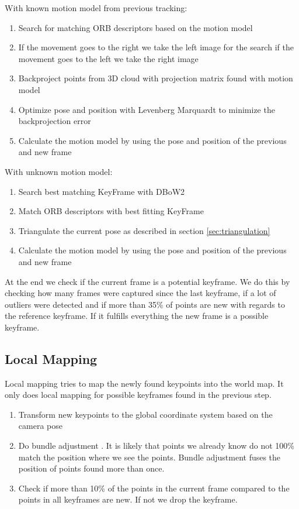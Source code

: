 \documentclass[11pt,a4paper,titlepage,oneside]{report}
\begin{document}
With known motion model from previous tracking:
\begin{enumerate}
	\item Search for matching ORB descriptors based on the motion model
	\item If the movement goes to the right we take the left image for the search if the movement goes to the left we take the right image
	\item Backproject points from 3D cloud with projection matrix found with motion model
	\item Optimize pose and position with Levenberg Marquardt \cite{levenbergmarquardt} to minimize the backprojection error
	\item Calculate the motion model by using the pose and position of the previous and new frame
\end{enumerate}

With unknown motion model:
\begin{enumerate}
	\item Search best matching KeyFrame with DBoW2 \cite{dbow}
	\item Match ORB descriptors with best fitting KeyFrame
	\item Triangulate the current pose as described in section \ref{sec:triangulation}
	\item Calculate the motion model by using the pose and position of the previous and new frame
\end{enumerate}

At the end we check if the current frame is a potential keyframe. We do this by checking how many frames were captured since the last keyframe, if a lot of outliers were detected and if more than 35\% of points are new with regards to the reference keyframe. If it fulfills everything the new frame is a possible keyframe.\\

\subsection{Local Mapping}
Local mapping tries to map the newly found keypoints into the world map. It only does local mapping for possible keyframes found in the previous step.
\begin{enumerate}
	\item Transform new keypoints to the global coordinate system based on the camera pose
	\item Do bundle adjustment \cite{bundleadjustment}. It is likely that points we already know do not 100\% match the position where we see the points. Bundle adjustment fuses the position of points found more than once.
	\item Check if more than 10\% of the points in the current frame compared to the points in all keyframes are new. If not we drop the keyframe.
\end{enumerate}
\end{document}
